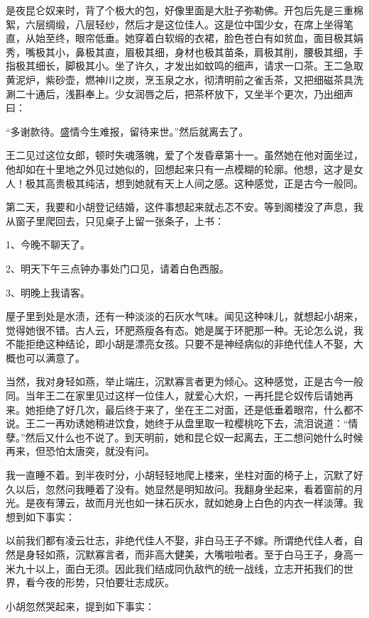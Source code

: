 是夜昆仑奴来时，背了个极大的包，好像里面是大肚子弥勒佛。开包后先是三重棉絮，六层绸缎，八层轻纱，然后才是这位佳人。这是位中国少女，在席上坐得笔直，从始至终，眼帘低垂。她穿着白软缎的衣裙，脸色苍白有如贫血，面目极其娟秀，嘴极其小，鼻极其直，眉极其细，身材也极其苗条，肩极其削，腰极其细，手指极其细长，脚极其小。坐了许久，才发出如蚊鸣的细声，请求一口茶。王二急取黄泥炉，紫砂壶，燃神川之炭，烹玉泉之水，彻清明前之雀舌茶，又把细磁茶具洗涮二十通后，浅斟奉上。少女润唇之后，把茶杯放下，又坐半个更次，乃出细声曰： 

“多谢款待。盛情今生难报，留待来世。”然后就离去了。 

王二见过这位女郎，顿时失魂落魄，爱了个发昏章第十一。虽然她在他对面坐过，他却如在十里地之外见过她似的，回想起来只有一点模糊的轮廓。他想，这才是女人！极其高贵极其纯洁，想到她就有天上人间之感。这种感觉，正是古今一般同。 

第二天，我要和小胡登记结婚，这件事想起来就忐忑不安。等到阁楼没了声息，我从窗子里爬回去，只见桌子上留一张条子，上书： 

1、今晚不聊天了。 

2、明天下午三点钟办事处门口见，请着白色西服。 

3、明晚上我请客。 

屋子里到处是水渍，还有一种淡淡的石灰水气味。闻见这种味儿，就想起小胡来，觉得她很不错。古人云，环肥燕瘦各有态。她是属于环肥那一种。无论怎么说，我不能拒绝这种结论，即小胡是漂亮女孩。只要不是神经病似的非绝代佳人不娶，大概也可以满意了。 

当然，我对身轻如燕，举止端庄，沉默寡言者更为倾心。这种感觉，正是古今一般同。当年王二在家里见过这样一位佳人，就爱心大炽，一再托昆仑奴传后请她再来。她拒绝了好几次，最后终于来了，坐在王二对面，还是低垂着眼帘，什么都不说。王二一再劝诱她稍进饮食，她终于从盘里取一粒樱桃吃下去，流泪说道：“情孽。”然后又什么也不说了。到天明前，她和昆仑奴一起离去，王二想问她什么时候再来，但恐怕太唐突，就没有问。 

我一直睡不着。到半夜时分，小胡轻轻地爬上楼来，坐柱对面的椅子上，沉默了好久以后，忽然问我睡着了没有。她显然是明知故问。我翻身坐起来，看着窗前的月光。是夜有薄云，故而月光也如一抹石灰水，就如她身上白色的内衣一样淡薄。我想到如下事实： 

以前我们都有凌云壮志，非绝代佳人不娶，非白马王子不嫁。所谓绝代佳人者，自然是身轻如燕，沉默寡言者，而非高大健美，大嘴啦啦者。至于白马王子，身高一米九十以上，面白无须。因此我们结成同仇敌忾的统一战线，立志开拓我们的世界，看今夜的形势，只怕要壮志成灰。 

小胡忽然哭起来，提到如下事实： 

